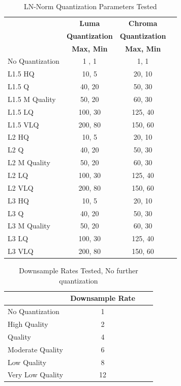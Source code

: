 \begin{table}[h!]
    \centering
    \caption{LN-Norm Quantization Parameters Tested}
    \begin{tabularx}{0.5\textwidth}{X c c c}
        \toprule
        \ & \textbf{Luma} & \textbf{Chroma} \\
        \ & \textbf{Quantization} & \textbf{Quantization} \\
        \ & \textbf{Max, Min} & \textbf{Max, Min} \\
        \midrule
        No Quantization & 1 , 1 & 1, 1 \\
        L1.5 HQ & 10, 5 & 20, 10 \\
        L1.5 Q & 40, 20 & 50, 30 \\
        L1.5 M Quality & 50, 20 & 60, 30 \\
        L1.5 LQ & 100, 30 & 125, 40 \\
        L1.5 VLQ & 200, 80 & 150, 60 \\
        L2 HQ & 10, 5 & 20, 10 \\
        L2 Q & 40, 20 & 50, 30 \\
        L2 M Quality & 50, 20 & 60, 30 \\
        L2 LQ & 100, 30 & 125, 40 \\
        L2 VLQ & 200, 80 & 150, 60 \\
        L3 HQ & 10, 5 & 20, 10 \\
        L3 Q & 40, 20 & 50, 30 \\
        L3 M Quality & 50, 20 & 60, 30 \\
        L3 LQ & 100, 30 & 125, 40 \\
        L3 VLQ & 200, 80 & 150, 60 \\
        \bottomrule
    \end{tabularx}
    \label{tab:Quantization-Parameters-LN-Norm}
\end{table}

\begin{table}[h!]
    \centering
    \caption{Downsample Rates Tested, No further quantization}
    \begin{tabularx}{0.5\textwidth}{X c c c}
        \toprule
        \ & \textbf{Downsample Rate} \\
        \midrule
        No Quantization & 1 \\
        High Quality & 2 \\
        Quality & 4 \\
        Moderate Quality & 6 \\
        Low Quality & 8 \\
        Very Low Quality & 12 \\
        \bottomrule
    \end{tabularx}
    \label{tab:Downsample Parameters}
\end{table}

